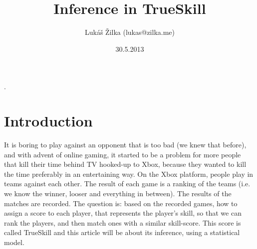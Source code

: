 \documentclass[12pt]{article}
\title{Inference in TrueSkill}
\date{30.5.2013}
\author{Lukáš Žilka (lukas@zilka.me)}
\begin{document}

\newcommand{\Normal}[0]{\mathcal{N}}
\newcommand{\dx}[1]{\mathrm{d}#1}

\newcount\colveccount
\newcommand*\colvec[1]{
        \global\colveccount#1
        \begin{bmatrix}
        \colvecnext
}
\def\colvecnext#1{
        #1
        \global\advance\colveccount-1
        \ifnum\colveccount>0
                \\
                \expandafter\colvecnext
        \else
                \end{bmatrix}
        \fi
}

\maketitle
{}.


\section{Introduction}
It is boring to play against an opponent that is too bad (we knew that before), and with advent of online gaming, it started to be a problem for more people that kill their time behind TV hooked-up to Xbox, because they wanted to kill the time preferably in an entertaining way. On the Xbox platform, people play in teams against each other. The result of each game is a ranking of the teams (i.e. we know the winner, looser and everything in between). The results of the matches are recorded. The question is: based on the recorded games, how to assign a score to each player, that represents the player's skill, so that we can rank the players, and then match ones with a similar skill-score. This score is called TrueSkill and this article will be about its inference, using a statistical model.
\end{document}
